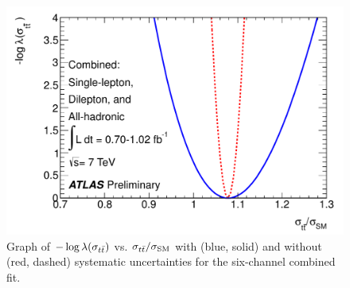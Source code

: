 \begin{figure}[ht!]
  \begin{center}
    \includegraphics[width=.7\textwidth]{figures/comb/fullcombined_likelihood_curve}
    \caption{Graph of $-\log\lambda(\sigma_{t\bar{t}})$ vs. $\sigma_{t\bar{t}}/\sigma_{\rm SM}$ with (blue, solid) and without (red, dashed) systematic uncertainties for the six-channel combined fit.}
    \label{fig:fullcombined_likelihood_curve}
  \end{center}
\end{figure}
